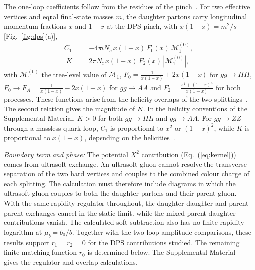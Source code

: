 \documentclass[%
 twocolumn,
 superscriptaddress,
 preprintnumbers,
 nofootinbib,
 amsmath,amssymb,
 aps,
 prl,
]{revtex4-2}
\newcommand{\M}{\mathcal M}
\begin{document}
The one-loop coefficients follow from the residues of the pinch~\cite{Gaunt:2011xd}.
For two effective vertices and equal final-state masses $m$, the daughter partons
carry longitudinal momentum fractions $x$ and $1-x$ at the DPS pinch,
with $x(1-x)=m^2/s$ [Fig.~\ref{fig:dps}(a)],
\begin{equation}
\begin{aligned}
C_1&=-4\pi iN_c\,x(1-x)\,F_0(x)\,\M_1^{(0)},\\
|K|&=2\pi N_c\,x(1-x)\,F_2(x)\,|\M_1^{(0)}|,
\end{aligned}
\label{eq:oneloop}
\end{equation}
with $\M_1^{(0)}$ the tree-level value of $\M_1$,
$F_0=\frac1{x(1-x)}+2x(1-x)$ for $gg\to HH$,
$F_0\to F_A=\frac1{x(1-x)}-2x(1-x)$ for $gg\to AA$ and $F_2=\frac{x^4+(1-x)^4}{x(1-x)}$ for both processes. These functions arise from the helicity overlaps of the
two splittings~\cite{SM}.
The second relation gives the magnitude of $K$.
In the helicity conventions of the Supplemental Material,
$K>0$ for both $gg\to HH$ and $gg\to AA$.
For $gg\to ZZ$ through a massless quark loop,
$C_1$ is proportional to $x^2$ or $(1-x)^2$,
while $K$ is proportional to $x(1-x)$, depending
on the helicities~\cite{Gaunt:2011xd,SM}.


\textit{Boundary term and phase:}
The potential $X^2$ contribution (Eq.~(\ref{eq:kernel})) comes from ultrasoft exchange. An ultrasoft gluon cannot resolve the transverse separation of the
two hard vertices and couples to the combined colour charge of each
splitting.
The calculation must therefore include diagrams in which the ultrasoft gluon couples to both the daughter partons and their parent gluon.
With the same rapidity regulator throughout, the daughter-daughter and parent-parent exchanges cancel in the static limit, while the mixed parent-daughter contributions vanish.
The calculated soft subtraction also has no finite rapidity logarithm
at $\mu_b=b_0/b$. Together with the two-loop amplitude comparisons,
these results support $r_1=r_2=0$ for the DPS contributions studied.
The remaining finite matching function $r_0$ is determined below.
The Supplemental Material~\cite{SM} gives the regulator and overlap
calculations.
\end{document}
